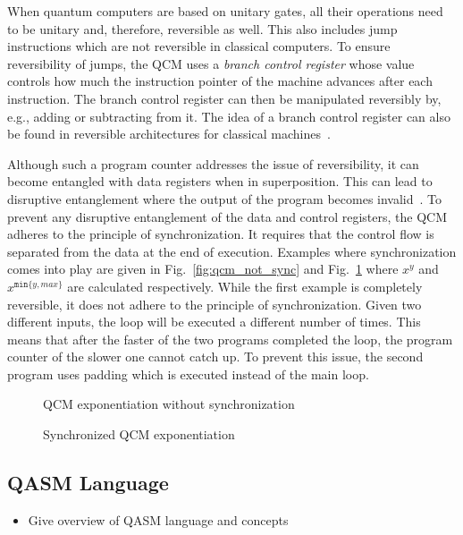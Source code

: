 When quantum computers are based on unitary gates, all their operations need to be unitary and, therefore, reversible as well. This also includes jump instructions which are not reversible in classical computers. To ensure reversibility of jumps, the QCM uses a \emph{branch control register} whose value controls how much the instruction pointer of the machine advances after each instruction. The branch control register can then be manipulated reversibly by, e.g., adding or subtracting from it. The idea of a branch control register can also be found in reversible architectures for classical machines~\cite{AGY07, TAG12}.

Although such a program counter addresses the issue of reversibility, it can become entangled with data registers when in superposition. This can lead to disruptive entanglement where the output of the program becomes invalid~\cite{YVC24}. To prevent any disruptive entanglement of the data and control registers, the QCM adheres to the principle of synchronization. 
It requires that the control flow is separated from the data at the end of execution. 
Examples where synchronization comes into play are given in Fig.~\ref{fig:qcm_not_sync} and Fig.~\ref{fig:qcm_sync} where $x^y$ and $x^{\texttt{min}\{y, max\}}$ are calculated respectively. 
While the first example is completely reversible, it does not adhere to the principle of synchronization. Given two different inputs, the loop will be executed a different number of times. This means that after the faster of the two programs completed the loop, the program counter of the slower one cannot catch up. To prevent this issue, the second program uses padding which is executed instead of the main loop. 

\begin{figure}[htp]
    \centering     
    \begin{minipage}{.40\textwidth}
        \vspace{7.5em}
        
        \caption{QCM exponentiation without synchronization}
        \label{fig:qcm_not_sync}
    \end{minipage}
    \hfill
    \begin{minipage}{.55\textwidth}
        
        \caption{Synchronized QCM exponentiation}    
        \label{fig:qcm_sync}
    \end{minipage}
\end{figure}

\subsection{QASM Language}
\begin{itemize}
    \item Give overview of QASM language and concepts
\end{itemize}